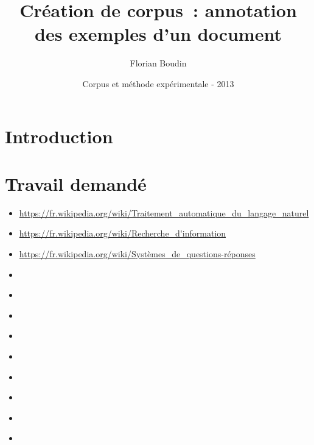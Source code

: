 \documentclass[12pt,a4paper]{article}
\begin{document}
\title{Création de corpus~: annotation des exemples d'un document}
\author{Florian Boudin}
\date{Corpus et méthode expérimentale - 2013}

\maketitle

\section{Introduction}


\section{Travail demandé}

\begin{itemize}
    \item \url{https://fr.wikipedia.org/wiki/Traitement_automatique_du_langage_naturel}
    \item \url{https://fr.wikipedia.org/wiki/Recherche_d'information}
    \item \url{https://fr.wikipedia.org/wiki/Systèmes_de_questions-réponses}
    \item \url{}
    \item \url{}
    \item \url{}
    \item \url{}
    \item \url{}
    \item \url{}
    \item \url{}
    \item \url{}
    \item \url{}
\end{itemize}
\end{document}

